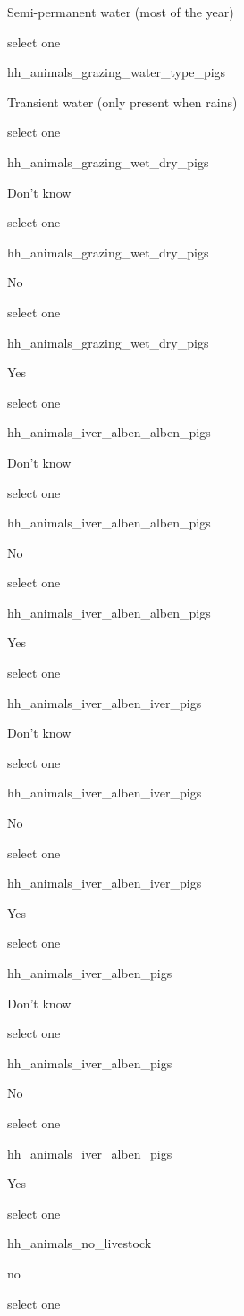 \documentclass[]{article}
\begin{document}
Semi-permanent water (most of the year)

select one

hh\_animals\_grazing\_water\_type\_pigs

Transient water (only present when rains)

select one

hh\_animals\_grazing\_wet\_dry\_pigs

Don't know

select one

hh\_animals\_grazing\_wet\_dry\_pigs

No

select one

hh\_animals\_grazing\_wet\_dry\_pigs

Yes

select one

hh\_animals\_iver\_alben\_alben\_pigs

Don't know

select one

hh\_animals\_iver\_alben\_alben\_pigs

No

select one

hh\_animals\_iver\_alben\_alben\_pigs

Yes

select one

hh\_animals\_iver\_alben\_iver\_pigs

Don't know

select one

hh\_animals\_iver\_alben\_iver\_pigs

No

select one

hh\_animals\_iver\_alben\_iver\_pigs

Yes

select one

hh\_animals\_iver\_alben\_pigs

Don't know

select one

hh\_animals\_iver\_alben\_pigs

No

select one

hh\_animals\_iver\_alben\_pigs

Yes

select one

hh\_animals\_no\_livestock

no

select one
\end{document}

